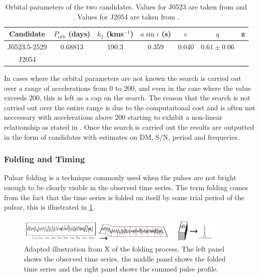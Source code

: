 \begin{table}[H]
    \centering
    \begin{tabular}{c|cccccc}
        \hline
        Candidate & $P_{\text{orb}}$ (days) & $k_2$ (kms$^{-1}$) & $a \sin i$ (s) & $e$ & $q$ & z\\
        \hline
        J0523.5-2529 & 0.68813 & 190.3 & 0.359 & 0.040 & $0.61 \pm 0.06$ & \\
        J2054 &  &  & & & & \\
        \hline \hline 
    \end{tabular}
    \caption{Orbital parameters of the two candidates. Values for J0523 are taken from \cite{strader_1fgl_2014} and \cite{halpern_luminous_2022}. Values for J2054 are taken from \cite{karpova_new_2023}.}
    \label{tab:orbital-parameters}
\end{table}

In cases where the orbital parameters are not known the search is carried out over a range of accelerations from 0 to 200, and even in the case where the value exceeds 200, this is left as a cap on the search. The reason that the search is not carried out over the entire range is due to the computaitonal cost and is often not neccessary with accelerations above 200 starting to exhibit a non-linear relationship as stated in \citet{ransom_new_2001}. Once the search is carried out the results are outputted in the form of candidates with estimates on DM, S/N, period and frequecies. 

\subsubsection{Folding and Timing}

Pulsar folding is a technique commonly used when the pulses are not bright enough to be clearly visible in the observed time series. The term folding comes from the fact that the time series is folded on itself by some trial period of the pulsar, this is illustrated in \cref{fig: folding}. 

\begin{figure}
    \centering
    \includegraphics[width = 0.9\textwidth]{figs/folding.png}
    \caption{Adapted illustration from X of the folding process. The left panel shows the observed time series, the middle panel shows the folded time series and the right panel shows the summed pulse profile.}
    \label{fig: folding}
\end{figure}


